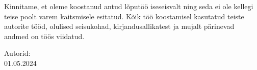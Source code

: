 Kinnitame, et oleme koostanud antud lõputöö iseseisvalt ning seda ei ole kellegi teise poolt
varem kaitsmisele esitatud. Kõik töö koostamisel kasutatud teiste autorite tööd, olulised
seisukohad, kirjandusallikatest ja mujalt pärinevad andmed on töös viidatud.

\begin{flushleft}

Autorid: \authorNames{}\\
\vspace*{0.5cm}
01.05.2024
 
\end{flushleft}

